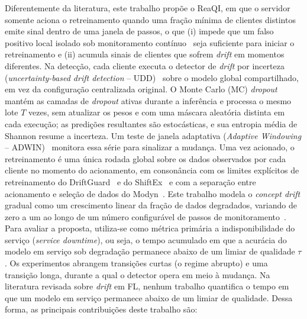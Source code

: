\documentclass[conference]{IEEEtran}
\begin{document}
Diferentemente da literatura, este trabalho propõe o ReaQI, em que o servidor somente aciona o retreinamento quando uma fração mínima de clientes distintos emite sinal dentro de uma janela de passos, o que (i) impede que um falso positivo local isolado sob monitoramento contínuo~\cite{poenaru2022} seja suficiente para iniciar o retreinamento e (ii) acumula sinais de clientes que sofrem \textit{drift} em momentos diferentes. Na detecção, cada cliente executa o detector de \textit{drift} por incerteza (\textit{uncertainty-based drift detection} -- UDD)~\cite{baier2023} sobre o modelo global compartilhado, em vez da configuração centralizada original. O Monte Carlo (MC) \textit{dropout}~\cite{gal2016} mantém as camadas de \textit{dropout} ativas durante a inferência e processa o mesmo lote $T$ vezes, sem atualizar os pesos e com uma máscara aleatória distinta em cada execução; as predições resultantes são estocásticas, e sua entropia média de Shannon resume a incerteza. Um teste de janela adaptativa (\textit{Adaptive Windowing} -- ADWIN)~\cite{bifet2007} monitora essa série para sinalizar a mudança. Uma vez acionado, o retreinamento é uma única rodada global sobre os dados observados por cada cliente no momento do acionamento, em consonância com os limites explícitos de retreinamento do DriftGuard~\cite{han2026} e do ShiftEx~\cite{bhope2025} e com a separação entre acionamento e seleção de dados do Modyn~\cite{bother2025}. Este trabalho modela o \textit{concept drift} gradual como um crescimento linear da fração de dados degradados, variando de zero a um ao longo de um número configurável de passos de monitoramento~\cite{cerqueira2026}.
%
Para avaliar a proposta, utiliza-se como métrica primária a indisponibilidade do serviço (\textit{service downtime}), ou seja, o tempo acumulado em que a acurácia do modelo em serviço sob degradação permanece abaixo de um limiar de qualidade $\tau$. Os experimentos abrangem transições curtas (o regime abrupto) e uma transição longa, durante a qual o detector opera em meio à mudança. Na literatura revisada sobre \textit{drift} em FL, nenhum trabalho quantifica o tempo em que um modelo em serviço permanece abaixo de um limiar de qualidade. Dessa forma, as principais contribuições deste trabalho são:
\end{document}
